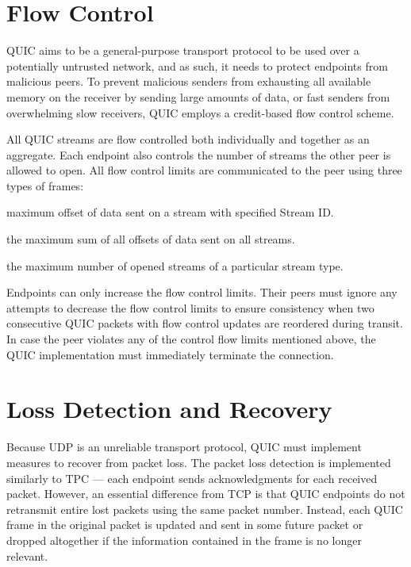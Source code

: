 \section{Flow Control}

QUIC aims to be a general-purpose transport protocol to be used over a potentially untrusted
network, and as such, it needs to protect endpoints from malicious peers. To prevent malicious
senders from exhausting all available memory on the receiver by sending large amounts of data, or
fast senders from overwhelming slow receivers, QUIC employs a credit-based flow control scheme.

All QUIC streams are flow controlled both individually and together as an aggregate. Each endpoint
also controls the number of streams the other peer is allowed to open. All flow control limits are
communicated to the peer using three types of frames:

\begin{itemize}

\litem[]{\MAXSTREAMDATA{}} maximum offset of data sent on a stream with specified Stream ID\@.

\litem[]{\MAXDATA{}} the maximum sum of all offsets of data sent on all streams.

\litem[]{\MAXSTREAMS{}} the maximum number of opened streams of a particular stream type.

\end{itemize}

Endpoints can only increase the flow control limits. Their peers must ignore any attempts to
decrease the flow control limits to ensure consistency when two consecutive QUIC packets with flow
control updates are reordered during transit. In case the peer violates any of the control flow
limits mentioned above, the QUIC implementation must immediately terminate the connection.

\section{Loss Detection and Recovery}\label{sec:02-loss-detection}

Because UDP is an unreliable transport protocol, QUIC must implement measures to recover from packet
loss. The packet loss detection is implemented similarly to TPC --- each endpoint sends
acknowledgments for each received packet. However, an essential difference from TCP is that QUIC
endpoints do not retransmit entire lost packets using the same packet number. Instead, each QUIC
frame in the original packet is updated and sent in some future packet or dropped altogether if the
information contained in the frame is no longer relevant.

